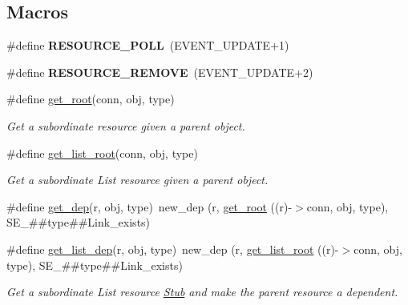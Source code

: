 \subsection*{Macros}
\begin{DoxyCompactItemize}
\item 
\mbox{\label{group__retrieval_ga509ffa3cc1f8769507050a47cc7c592c}} 
\#define {\bfseries R\+E\+S\+O\+U\+R\+C\+E\+\_\+\+P\+O\+LL}~(E\+V\+E\+N\+T\+\_\+\+U\+P\+D\+A\+TE+1)
\item 
\mbox{\label{group__retrieval_ga683225f11cfab927d9715cd71af0b927}} 
\#define {\bfseries R\+E\+S\+O\+U\+R\+C\+E\+\_\+\+R\+E\+M\+O\+VE}~(E\+V\+E\+N\+T\+\_\+\+U\+P\+D\+A\+TE+2)
\item 
\#define \hyperlink{group__retrieval_gae0aa47da379792fa9140b33c15717432}{get\+\_\+root}(conn,  obj,  type)
\begin{DoxyCompactList}\small\item\em Get a subordinate resource given a parent object. \end{DoxyCompactList}\item 
\#define \hyperlink{group__retrieval_ga697aeee2ace4e231973511356419305b}{get\+\_\+list\+\_\+root}(conn,  obj,  type)
\begin{DoxyCompactList}\small\item\em Get a subordinate List resource given a parent object. \end{DoxyCompactList}\item 
\#define \hyperlink{group__retrieval_gad89a532bdbbf6035ee756dc3deaa0d8f}{get\+\_\+dep}(r,  obj,  type)~new\+\_\+dep (r, \hyperlink{group__retrieval_gae0aa47da379792fa9140b33c15717432}{get\+\_\+root} ((r)-\/$>$conn, obj, type), S\+E\+\_\+\#\#type\#\#Link\+\_\+exists)
\item 
\#define \hyperlink{group__retrieval_ga504d67179b0a93f66842e322429ade11}{get\+\_\+list\+\_\+dep}(r,  obj,  type)~new\+\_\+dep (r, \hyperlink{group__retrieval_ga697aeee2ace4e231973511356419305b}{get\+\_\+list\+\_\+root} ((r)-\/$>$conn, obj, type), S\+E\+\_\+\#\#type\#\#Link\+\_\+exists)
\begin{DoxyCompactList}\small\item\em Get a subordinate List resource \hyperlink{structStub}{Stub} and make the parent resource a dependent. \end{DoxyCompactList}\end{DoxyCompactItemize}
